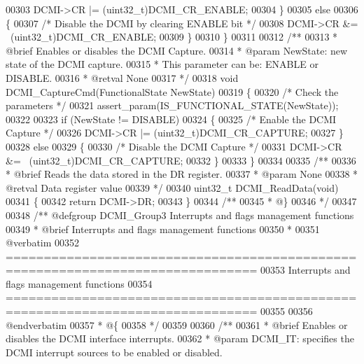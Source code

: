 \begin{DoxyCode}
00303     DCMI->CR |= (uint32\_t)DCMI_CR_ENABLE;
00304   \}
00305   \textcolor{keywordflow}{else}
00306   \{
00307     \textcolor{comment}{/* Disable the DCMI by clearing ENABLE bit */}
00308     DCMI->CR &= ~(uint32\_t)DCMI_CR_ENABLE;
00309   \}
00310 \}
00311 
00312 \textcolor{comment}{/**}
00313 \textcolor{comment}{  * @brief  Enables or disables the DCMI Capture.}
00314 \textcolor{comment}{  * @param  NewState: new state of the DCMI capture. }
00315 \textcolor{comment}{  *          This parameter can be: ENABLE or DISABLE.}
00316 \textcolor{comment}{  * @retval None}
00317 \textcolor{comment}{  */}
00318 \textcolor{keywordtype}{void} DCMI_CaptureCmd(FunctionalState NewState)
00319 \{
00320   \textcolor{comment}{/* Check the parameters */}
00321   assert_param(IS\_FUNCTIONAL\_STATE(NewState));
00322 
00323   \textcolor{keywordflow}{if} (NewState != DISABLE)
00324   \{
00325     \textcolor{comment}{/* Enable the DCMI Capture */}
00326     DCMI->CR |= (uint32\_t)DCMI_CR_CAPTURE;
00327   \}
00328   \textcolor{keywordflow}{else}
00329   \{
00330     \textcolor{comment}{/* Disable the DCMI Capture */}
00331     DCMI->CR &= ~(uint32\_t)DCMI_CR_CAPTURE;
00332   \}
00333 \}
00334 
00335 \textcolor{comment}{/**}
00336 \textcolor{comment}{  * @brief  Reads the data stored in the DR register.}
00337 \textcolor{comment}{  * @param  None }
00338 \textcolor{comment}{  * @retval Data register value}
00339 \textcolor{comment}{  */}
00340 uint32\_t DCMI_ReadData(\textcolor{keywordtype}{void})
00341 \{
00342   \textcolor{keywordflow}{return} DCMI->DR;
00343 \}
00344 \textcolor{comment}{/**}
00345 \textcolor{comment}{  * @\}}
00346 \textcolor{comment}{  */}
00347 
00348 \textcolor{comment}{/** @defgroup DCMI\_Group3 Interrupts and flags management functions}
00349 \textcolor{comment}{ *  @brief   Interrupts and flags management functions}
00350 \textcolor{comment}{ *}
00351 \textcolor{comment}{@verbatim   }
00352 \textcolor{comment}{ ===============================================================================}
00353 \textcolor{comment}{                  Interrupts and flags management functions}
00354 \textcolor{comment}{ ===============================================================================  }
00355 \textcolor{comment}{}
00356 \textcolor{comment}{@endverbatim}
00357 \textcolor{comment}{  * @\{}
00358 \textcolor{comment}{  */}
00359 
00360 \textcolor{comment}{/**}
00361 \textcolor{comment}{  * @brief  Enables or disables the DCMI interface interrupts.}
00362 \textcolor{comment}{  * @param  DCMI\_IT: specifies the DCMI interrupt sources to be enabled or disabled. }

\end{DoxyCode}
